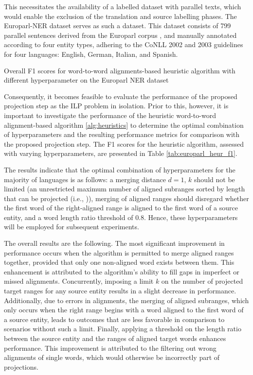 This necessitates the availability of a labelled dataset with parallel texts,
which would enable the exclusion of the translation and source labelling phases.
The Europarl-NER dataset \cite{agerri-etal-2018-building} serves as such a dataset.
This dataset consists of 799 parallel sentences derived from the Europarl corpus \cite{koehn2005europarl},
and manually annotated according to four entity types, adhering to the CoNLL 2002 and 2003
guidelines for four languages: English, German, Italian, and Spanish.

\begin{table}[ht]
  \centering
  
  \caption{Overall F1 scores for word-to-word alignments-based heuristic
  algorithm with different hyperparameter  on the Europarl NER dataset}
  \label{tab:europarl_heur_f1}
\end{table}

Consequently, it becomes feasible to evaluate the performance of the proposed
projection step as the ILP problem in isolation. Prior to this, however, it is
important to investigate the performance of the heuristic word-to-word alignment-based
algorithm \ref{alg:heuristics} to determine the optimal combination of hyperparameters
and the resulting performance metrics for comparison with the proposed projection step.
The F1 scores for the heuristic algorithm, assessed with varying hyperparameters, are
presented in Table \ref{tab:europarl_heur_f1}.

The results indicate that the optimal combination of hyperparameters for the majority of
languages is as follows: a merging distance \( d = 1 \), \( k \) should not be
limited (an unrestricted maximum number of aligned subranges sorted by
length that can be projected (i.e., )),
merging of aligned ranges should disregard whether the first word of the
right-aligned range is aligned to the first word of a source entity, and a word length
ratio threshold of \( 0.8 \).
Hence, these hyperparameters will be employed for subsequent experiments.

The overall results are the following. The most significant improvement in performance
occurs when the algorithm is permitted to merge aligned ranges together, provided
that only one non-aligned word exists between them. This enhancement is attributed to
the algorithm's ability to fill gaps in imperfect or missed alignments. Concurrently,
imposing a limit \( k \) on the number of projected target ranges for any source entity
results in a slight decrease in performance. Additionally, due to errors in alignments,
the merging of aligned subranges, which only occurs when the right range begins with a
word aligned to the first word of a source entity, leads to outcomes that are less
favorable in comparison to scenarios without such a limit. Finally, applying a threshold
on the length ratio between the source entity and the ranges of aligned target
words enhances performance. This improvement is attributed to the filtering out
wrong alignments of single words, which would otherwise be incorrectly part of projections.

